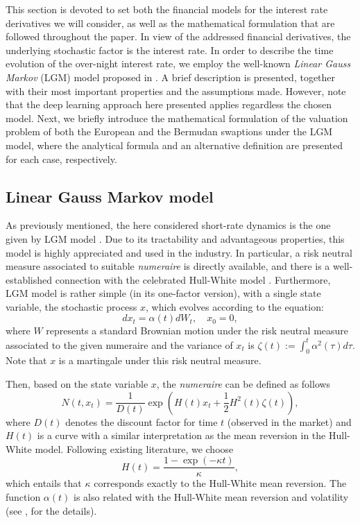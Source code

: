     This section is devoted to set both the financial models for the interest rate derivatives we will consider, as well as the mathematical formulation that are followed throughout the paper. In view of the addressed financial derivatives, the underlying stochastic factor is the interest rate. In order to describe the time evolution of the over-night interest rate, we employ the  well-known \emph{Linear Gauss Markov} (LGM) model proposed in \cite{hagan2002, hagan2004}. A brief description is presented, together with their most important properties and the assumptions made. However, note that the deep learning approach here presented applies regardless the chosen model. Next, we briefly introduce the mathematical formulation of the valuation problem of both the European and the Bermudan swaptions under the LGM model, where the analytical formula and an alternative definition are presented for each case, respectively.
    
    
    \subsection{Linear Gauss Markov model}
        
        As previously mentioned, the here considered short-rate dynamics is the one given by LGM model \cite{hagan2002}. Due to its tractability and advantageous properties, this model is highly appreciated and used in the industry. In particular, a risk neutral measure associated to suitable \emph{numeraire} is directly available, and there is a well-established connection with the celebrated Hull-White model \cite{hullwhite1990}. Furthermore, LGM model is rather simple (in its one-factor version), with a single state variable, the stochastic process $x$, which evolves according to the equation:
        \begin{equation}\label{eq:lgm}
            dx_t = \alpha(t)dW_t, \quad x_0 = 0,
        \end{equation}
        where $W$ represents a standard Brownian motion under the risk neutral measure associated to the given numeraire and the variance of $x_t$ is $\zeta(t) := \int_0^t \alpha^2(\tau)d\tau$. Note that $x$ is a martingale under this risk neutral measure.
        
        Then, based on the state variable $x$, the \emph{numeraire} can be defined as follows
        \begin{equation*}
            N(t, x_t) = \frac{1}{D(t)}\exp\left(H(t)x_t + \frac{1}{2}H^2(t)\zeta(t)\right),
        \end{equation*}
        where $D(t)$ denotes the discount factor for time $t$ (observed in the market) and $H(t)$ is a curve with a similar interpretation as the mean reversion in the Hull-White model. Following existing literature, we choose
        \begin{equation*}
            H(t) = \frac{1 - \exp(-\kappa t)}{\kappa},
        \end{equation*}
        which entails that $\kappa$ corresponds exactly to the Hull-White mean reversion. The function $\alpha(t)$ is also related with the Hull-White mean reversion and volatility (see \cite{hagan2002}, for the details).
    
